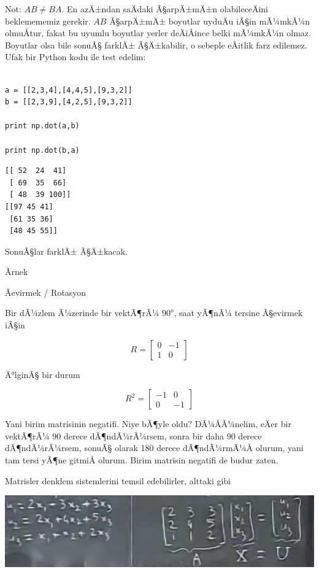 \documentclass[12pt,fleqn]{article}\usepackage{../../common}
\begin{document}
Not: $AB \ne BA$. En azÄ±ndan saÄdaki Ã§arpÄ±mÄ±n olabileceÄini beklemememiz
gerekir. $AB$ Ã§arpÄ±mÄ± boyutlar uyduÄu iÃ§in mÃ¼mkÃ¼n olmuÅtur, fakat bu uyumlu
boyutlar yerler deÄiÅince belki mÃ¼mkÃ¼n olmaz. Boyutlar olsa bile sonuÃ§
farklÄ± Ã§Ä±kabilir, o sebeple eÅitlik farz edilemez. Ufak bir Python kodu ile
test edelim:

\begin{verbatim}

a = [[2,3,4],[4,4,5],[9,3,2]]
b = [[2,3,9],[4,2,5],[9,3,2]]

print np.dot(a,b)

print np.dot(b,a)
\end{verbatim}

\begin{verbatim}
[[ 52  24  41]
 [ 69  35  66]
 [ 48  39 100]]
[[97 45 41]
 [61 35 36]
 [48 45 55]]
\end{verbatim}

SonuÃ§lar farklÄ± Ã§Ä±kacak. 

Ãrnek

Ãevirmek / Rotasyon

Bir dÃ¼zlem Ã¼zerinde bir vektÃ¶rÃ¼ $90^o$, saat yÃ¶nÃ¼ tersine Ã§evirmek iÃ§in 

$$ R =
\left[\begin{array}{rr}
0 & -1 \\
1 & 0
\end{array}\right]
 $$

Ä°lginÃ§ bir durum

$$ R^2 =
\left[\begin{array}{rr}
-1 & 0 \\
0 & -1
\end{array}\right]
 $$

Yani birim matrisinin negatifi. Niye bÃ¶yle oldu? DÃ¼ÅÃ¼nelim, eÄer
bir vektÃ¶rÃ¼ 90 derece dÃ¶ndÃ¼rÃ¼rsem, sonra bir daha 90 derece dÃ¶ndÃ¼rÃ¼rsem, sonuÃ§ 
olarak 180 derece dÃ¶ndÃ¼rmÃ¼Å olurum, yani tam tersi yÃ¶ne gitmiÅ olurum. Birim 
matrisin negatifi de budur zaten. 

Matrisler denklem sistemlerini temsil edebilirler, alttaki gibi

\begin{center}
\includegraphics[width=14.9cm]{3_5.png}
\end{center}
\end{document}
